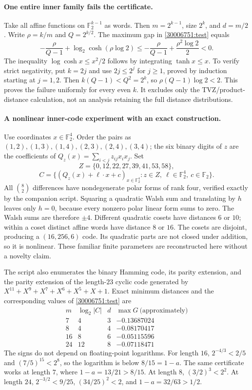 \documentclass[11pt,a4paper]{article}
\newcommand{\F}{\mathbb{F}}
\numberwithin{equation}{section}
\begin{document}
\paragraph{One entire inner family fails the certificate.}
Take all affine functions on $\F_2^{k-1}$ as words. Then $m=2^{k-1}$,
size $2^k$, and $d=m/2$. Write $\rho=k/m$ and $Q=2^{k/2}$. The maximum
gap in \eqref{30006751:test} equals
\[
 -\frac{\rho}{Q-1}+\log_2\cosh(\rho\log2)
 \le-\frac{\rho}{Q-1}+\frac{\rho^2\log2}{2}<0.
\]
The inequality $\log\cosh x\le x^2/2$ follows by integrating
$\tanh x\le x$. To verify strict negativity, put $k=2j$ and use
$2j\le2^j$ for $j\ge1$, proved by induction starting at $j=1,2$.
Then $k(Q-1)<Q^2=2^k$, so $\rho(Q-1)\log2<2$. This proves the failure
uniformly for every even $k$. It excludes only the TVZ/product-distance
calculation, not an analysis retaining the full distance distributions.

\paragraph{A nonlinear inner-code experiment with an exact construction.}
Use coordinates $x\in\F_2^4$. Order the pairs as
$(1,2),(1,3),(1,4),(2,3),(2,4),(3,4)$; the six binary digits of $z$ are the
coefficients of $Q_z(x)=\sum_{i<j}z_{ij}x_ix_j$. Set
\[
 Z=\{0,12,22,27,39,41,53,58\},
\]
\[
 C=\{(Q_z(x)+\ell\cdot x+c)_{x\in\F_2^4}:
       z\in Z,\ \ell\in\F_2^4,\ c\in\F_2\}.
\]
All $\binom82$ differences have nondegenerate polar forms of rank four,
verified exactly by the companion script. Squaring a quadratic Walsh sum
and translating by $h$ leaves only $h=0$, because every nonzero polar linear
form sums to zero. The Walsh sums are therefore $\pm4$. Different quadratic
cosets have distances $6$ or $10$; within a coset distinct affine words have
distance $8$ or $16$. The cosets are disjoint, producing a $(16,256,6)$ code.
Its quadratic parts are not closed under addition, so it is nonlinear.
These familiar finite parameters are reconstructed here without a novelty
claim.

The script also enumerates the binary Hamming code, its parity extension,
and the parity extension of the length-$23$ cyclic code generated by
$X^{11}+X^9+X^7+X^6+X^5+X+1$. Exact minimum distances and the corresponding
values of \eqref{30006751:test} are
\[
\begin{array}{c|c|c|r}
 m&\log_2|C|&d&\max G\ \text{(approximately)}\\\hline
 7&4&3&-0.13687024\\
 8&4&4&-0.08170417\\
 16&8&6&-0.05115596\\
 24&12&8&-0.07118471
\end{array}
\]
The signs do not depend on floating-point logarithms. For length $16$,
$2^{-4/3}<2/5$ and $(7/5)^{15}<2^8$, so the logarithm is below
$8/15=1-a$. The same certificate works at length $7$, where
$1-a=13/21>8/15$. At length $8$, $(3/2)^3<2^2$. At length $24$,
$2^{-3/2}<9/25$, $(34/25)^2<2$, and $1-a=32/63>1/2$.
\end{document}
